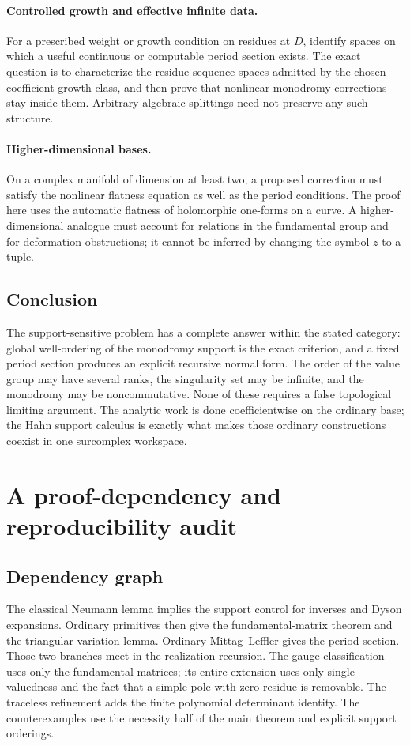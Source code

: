 \documentclass[11pt,letterpaper]{article}
\numberwithin{equation}{section}
\theoremstyle{definition}
\theoremstyle{remark}
\begin{document}
\paragraph{Controlled growth and effective infinite data.}
For a prescribed weight or growth condition on residues at $D$, identify
spaces on which a useful continuous or computable period section exists.
The exact question is to characterize the residue sequence spaces admitted
by the chosen coefficient growth class, and then prove that nonlinear
monodromy corrections stay inside them. Arbitrary algebraic splittings
need not preserve any such structure.

\paragraph{Higher-dimensional bases.}
On a complex manifold of dimension at least two, a proposed correction
must satisfy the nonlinear flatness equation as well as the period
conditions. The proof here uses the automatic flatness of holomorphic
one-forms on a curve. A higher-dimensional analogue must account for
relations in the fundamental group and for deformation obstructions;
it cannot be inferred by changing the symbol $z$ to a tuple.

\subsection{Conclusion}
The support-sensitive problem has a complete answer within the stated
category: global well-ordering of the monodromy support is the exact
criterion, and a fixed period section produces an explicit recursive normal
form. The order of the value group may have several ranks, the singularity
set may be infinite, and the monodromy may be noncommutative. None of these
requires a false topological limiting argument. The analytic work is done
coefficientwise on the ordinary base; the Hahn support calculus is exactly
what makes those ordinary constructions coexist in one surcomplex
workspace.

\appendix
\section{A proof-dependency and reproducibility audit}\label{app:audit}

\subsection{Dependency graph}
The classical Neumann lemma implies the support control for inverses and
Dyson expansions. Ordinary primitives then give the fundamental-matrix
theorem and the triangular variation lemma. Ordinary Mittag--Leffler gives
the period section. Those two branches meet in the realization recursion.
The gauge classification uses only the fundamental matrices; its entire
extension uses only single-valuedness and the fact that a simple pole with
zero residue is removable. The traceless refinement adds the finite
polynomial determinant identity. The counterexamples use the necessity
half of the main theorem and explicit support orderings.
\end{document}
